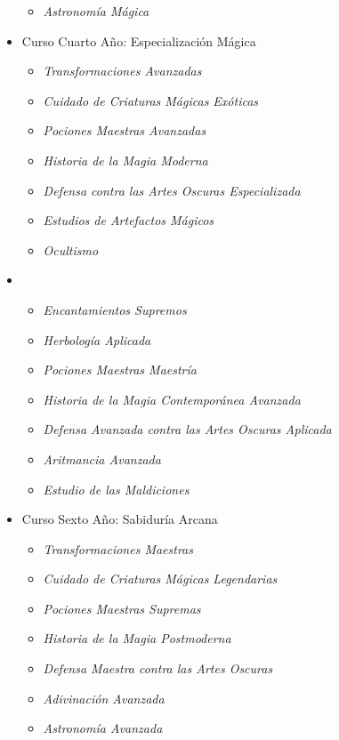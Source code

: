 \begin{itemize}
\begin{itemize}
      \item \textit{Astronomía Mágica}
    \end{itemize}
  \item Curso Cuarto Año: Especialización Mágica
    \begin{itemize}
      \item \textit{Transformaciones Avanzadas}
      \item \textit{Cuidado de Criaturas Mágicas Exóticas}
      \item \textit{Pociones Maestras Avanzadas}
      \item \textit{Historia de la Magia Moderna}
      \item \textit{Defensa contra las Artes Oscuras Especializada}
      \item \textit{Estudios de Artefactos Mágicos}
      \item \textit{Ocultismo}
    \end{itemize}
  \item 
    \begin{itemize}
      \item \textit{Encantamientos Supremos}
      \item \textit{Herbología Aplicada}
      \item \textit{Pociones Maestras Maestría}
      \item \textit{Historia de la Magia Contemporánea Avanzada}
      \item \textit{Defensa Avanzada contra las Artes Oscuras Aplicada}
      \item \textit{Aritmancia Avanzada}
      \item \textit{Estudio de las Maldiciones}
    \end{itemize}
  \item Curso Sexto Año: Sabiduría Arcana
    \begin{itemize}
      \item \textit{Transformaciones Maestras}
      \item \textit{Cuidado de Criaturas Mágicas Legendarias}
      \item \textit{Pociones Maestras Supremas}
      \item \textit{Historia de la Magia Postmoderna}
      \item \textit{Defensa Maestra contra las Artes Oscuras}
      \item \textit{Adivinación Avanzada}
      \item \textit{Astronomía Avanzada}
    \end{itemize}
\end{itemize}

